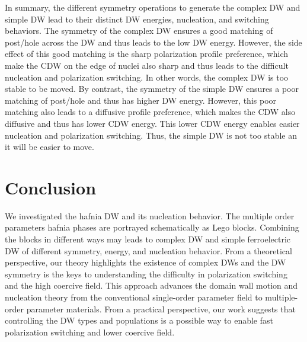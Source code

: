 \documentclass[12pt]{article}
\begin{document}
In summary, the different symmetry operations to generate the complex DW and simple DW lead to their distinct DW energies, nucleation, and switching behaviors.
The symmetry of the complex DW ensures a good matching of post/hole across the DW and thus leads to the low DW energy.
However, the side effect of this good matching is the sharp polarization profile preference, which make the CDW on the edge of nuclei also sharp and thus leads to the difficult nucleation and polarization switching.
In other words, the complex DW is too stable to be moved.
By contrast, the symmetry of the simple DW ensures a poor matching of post/hole and thus has higher DW energy.
However, this poor matching also leads to a diffusive profile preference, which makes the CDW also diffusive and thus has lower CDW energy.
This lower CDW energy enables easier nucleation and polarization switching.
Thus, the simple DW is not too stable an it will be easier to move.

\section*{Conclusion}
We investigated the hafnia DW and its nucleation behavior.
The multiple order parameters hafnia phases are portrayed schematically as Lego blocks. 
Combining the blocks in different ways may leads to complex DW and simple ferroelectric DW of different symmetry, energy, and nucleation behavior.
From a theoretical perspective, our theory highlights the existence of complex DWs and the DW symmetry is the keys to understanding the difficulty in polarization switching and the high coercive field. This approach advances the domain wall motion and nucleation theory from the conventional single-order parameter field to multiple-order parameter materials.  
From a practical perspective, our work suggests that controlling the DW types and populations is a possible way to enable fast polarization switching and lower coercive field.
\end{document}
